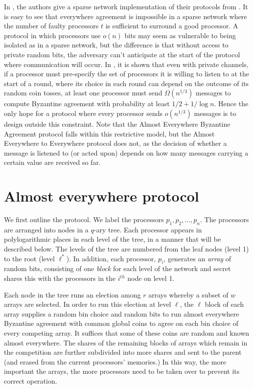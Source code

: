 \documentclass[letterpaper,11pt]{article}
\begin{document}
In \cite{KSSV2}, the authors give a sparse network implementation of their protocols from \cite{KSSV}.   It is easy to see that everywhere agreement is impossible in a sparse network where the number of faulty processors $t$ is sufficient to surround  a good processor.  A protocol in which processors use $o(n)$ bits may seem as vulnerable to being isolated as in a sparse network, but the difference is that without access to private random bits, the adversary can't anticipate at the start of the protocol where communication will occur.   In \cite{HKK}, it is shown that even with private channels, if a processor must pre-specify the set of processors it is willing to listen to at the start of a round,  where its choice in each round can depend on the outcome of its random coin tosses, at least one processor must send $\Omega(n^{1/3})$ messages to compute Byzantine agreement with probability at least $1/2+ 1/\log n$.  Hence the only hope for a protocol where every processor sends $o(n^{1/3})$ messages is to design outside this constraint.  Note that the Almost Everywhere Byzantine Agreement protocol falls within this restrictive model, but the Almost Everywhere to Everywhere protocol does not, as the decision of whether a message is listened to  (or acted upon) depends on how many messages carrying a certain value are received so far. 

\section{Almost everywhere protocol} \label{s:aeprotocol}

We first outline the protocol.  We label the processors $p_{1}, p_{2}, \ldots, p_{n}$.  The processors are arranged into nodes in a $q$-ary tree. Each processor appears in polylogarithmic places in each level of the tree, in a manner that will be described below. The levels of the tree are numbered from the leaf nodes (level 1) to the root (level $\ell^*$).  In addition, each processor, $p_{i}$, generates an \emph{array} of random bits, consisting of one \emph{block} for each level of the network and secret shares this with the processors in the $i^{th}$ node on level 1. 

Each node in the tree runs an election among $r$ arrays whereby a subset of $w$ arrays are selected.  In order to run this election at level $\ell$,
the $\ell$ block of each array supplies a random bin choice and random bits to run almost everywhere Byzantine agreement with common global coins to agree on each bin choice of every competing array.  It suffices that some of these coins are random and known almost everywhere. The  shares of  the remaining blocks of arrays  which remain in the competition are further subdivided into more shares and sent to the parent  (and erased from the current processors'
memories.) In this way, the more important the arrays, the more processors  need to be taken over to prevent its correct operation.
\end{document}
